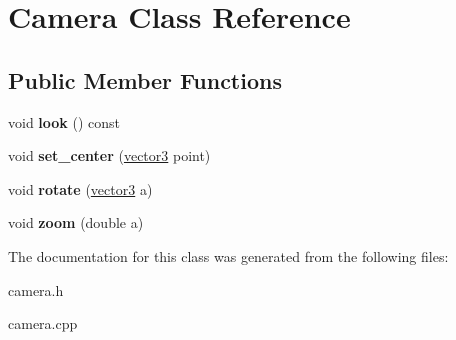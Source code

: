 \hypertarget{class_camera}{
\section{Camera Class Reference}
\label{class_camera}
}
\subsection*{Public Member Functions}
\begin{DoxyCompactItemize}
\item 
\hypertarget{class_camera_ae8f2a4d0c4406d26d0f203fd976ba8e6}{
void {\bfseries look} () const }
\label{class_camera_ae8f2a4d0c4406d26d0f203fd976ba8e6}

\item 
\hypertarget{class_camera_a90b568b545a85ff1ac6346fbcff70493}{
void {\bfseries set\_\-center} (\hyperlink{classvector3d}{vector3} point)}
\label{class_camera_a90b568b545a85ff1ac6346fbcff70493}

\item 
\hypertarget{class_camera_a636faf22e94bafbe090385697de07c23}{
void {\bfseries rotate} (\hyperlink{classvector3d}{vector3} a)}
\label{class_camera_a636faf22e94bafbe090385697de07c23}

\item 
\hypertarget{class_camera_a9cfbaa9aeca1cb3b52b0a28283aed8f4}{
void {\bfseries zoom} (double a)}
\label{class_camera_a9cfbaa9aeca1cb3b52b0a28283aed8f4}

\end{DoxyCompactItemize}


The documentation for this class was generated from the following files:\begin{DoxyCompactItemize}
\item 
camera.h\item 
camera.cpp\end{DoxyCompactItemize}
